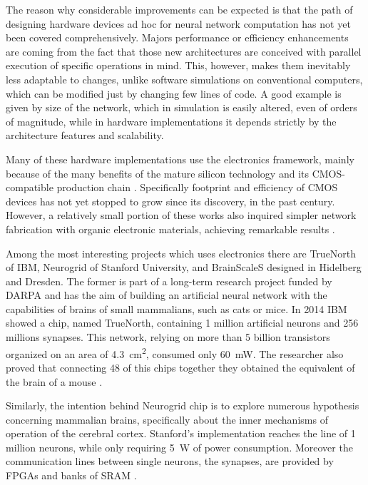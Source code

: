 The reason why considerable improvements can be expected is that the path of designing hardware devices ad hoc for neural network computation has not yet been covered comprehensively.
Majors performance or efficiency enhancements are coming from the fact that those new architectures are conceived with parallel execution of specific operations in mind.
This, however, makes them inevitably less adaptable to changes, unlike software simulations on conventional computers, which can be modified just by changing few lines of code.
A good example is given by size of the network, which in simulation is easily altered, even of orders of magnitude, while in hardware implementations it depends strictly by the architecture features and scalability.

Many of these hardware implementations use the electronics framework, mainly because of the many benefits of the mature silicon technology and its CMOS-compatible production chain \cite{}.
Specifically footprint and efficiency of CMOS devices has not yet stopped to grow since its discovery, in the past century.
However, a relatively small portion of these works also inquired simpler network fabrication with organic electronic materials, achieving remarkable results \cite{Nawrocki2016a}.

Among the most interesting projects which uses electronics there are TrueNorth of IBM, Neurogrid of Stanford University, and BrainScaleS designed in Hidelberg and Dresden.
The former is part of a long-term research project funded by DARPA and has the aim of building an artificial neural network with the capabilities of brains of small mammalians, such as cats or mice.
In 2014 IBM showed a chip, named TrueNorth, containing 1 million artificial neurons and 256 millions synapses.
This network, relying on more than 5 billion transistors organized on an area of \SI{4.3}{\square\cm}, consumed only \SI{60}{\mW}.
The researcher also proved that connecting 48 of this chips together they obtained the equivalent of the brain of a mouse \cite{Nawrocki2016a}.

Similarly, the intention behind Neurogrid chip is to explore numerous hypothesis concerning mammalian brains, specifically about the inner mechanisms of operation of the cerebral cortex.
Stanford's implementation reaches the line of 1 million neurons, while only requiring \SI{5}{\W} of power consumption.
Moreover the communication lines between single neurons, the synapses, are provided by FPGAs and banks of SRAM \cite{Nawrocki2016a}.

